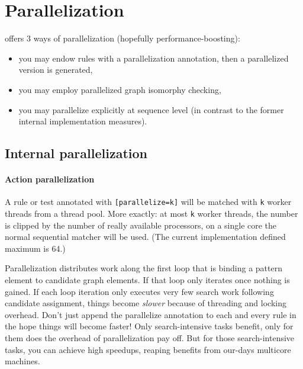 \chapter{Parallelization}\label{cha:parallel} 

\GrG{} offers 3 ways of parallelization (hopefully performance-boosting):

\begin{itemize}
	\item you may endow rules with a parallelization annotation, then a parallelized version is generated, 
	\item you may employ parallelized graph isomorphy checking, 
	\item you may parallelize explicitly at sequence level (in contrast to the former internal implementation measures).
\end{itemize}


\section{Internal parallelization}\label{sec:internalparallelization}

\subsubsection*{Action parallelization}

A rule or test annotated with \texttt{[parallelize=k]} will be matched with \texttt{k} worker threads from a thread pool.
More exactly: at most \texttt{k} worker threads, the number is clipped by the number of really available processors, on a single core the normal sequential matcher will be used.
(The current implementation defined maximum is 64.)

Parallelization distributes work along the first loop that is binding a pattern element to candidate graph elements.
If that loop only iterates once nothing is gained.
If each loop iteration only executes very few search work following candidate assignment,
things become \emph{slower} because of threading and locking overhead.
Don't just append the parallelize annotation to each and every rule in the hope things will become faster!
Only search-intensive tasks benefit, only for them does the overhead of parallelization pay off.
But for those search-intensive tasks, you can achieve high speedups, reaping benefits from our-days multicore machines. 

